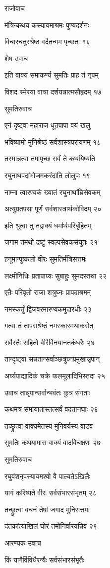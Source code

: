 राजोवाच

मंत्रिन्कथय कस्यायमाश्रमः पुण्यदर्शनः

विचारचतुरश्रेष्ठ वदैतन्मम पृच्छतः १६

शेष उवाच

इति वाक्यं समाकर्ण्य सुमतिः प्राह तं नृपम्

विशद स्मेरया वाचा दर्शयन्नात्मसौहृदम् १७

सुमतिरुवाच

एनं दृष्ट्वा महाराज धूतपापा वयं खलु

भविष्यामो मुनिश्रेष्ठं सर्वशास्त्रपरायणम् १८

तस्मान्नत्वा तमापृच्छ सर्वं ते कथयिष्यति

रघुनाथपदांभोजमकरंदाति लोलुपः १९

नाम्ना त्वारण्यकं ख्यातं रघुनाथांघ्रिसेवकम्

अत्युग्रतपसा पूर्णं सर्वशास्त्रार्थकोविदम् २०

इति श्रुत्वा तु तद्वाक्यं धर्मार्थपरिबृंहितम्

जगाम तमथो द्रष्टुं स्वल्पसेवकसंयुतः २१

हनूमान्पुष्कलो वीरः सुमतिर्मंत्रिसत्तमः

लक्ष्मीनिधिः प्रतापाग्र्यः सुबाहुः सुमदस्तथा २२

एतैः परिवृतो राजा शत्रुघ्नः प्रापदाश्रमम्

नमस्कर्तुं द्विजवरमारण्यकमुदारधीः २३

गत्वा तं तापसश्रेष्ठं नमस्कारमथाकरोत्

सर्वैस्तैः सहितो वीरैर्विनयानतकंधरैः २४

तान्दृष्ट्वा सन्नतान्सर्वाञ्छत्रुघ्नप्रमुखान्नृपान्

अर्घ्यपाद्यादिकं चक्रे फलमूलादिभिस्तदा २५

उवाच तान्नृपान्सर्वान्भवंतः कुत्र संगताः

कथमत्र समायातास्तत्सर्वं वदतानघाः २६

तच्छ्रुत्वा वाक्यमेतस्य मुनिवर्यस्य वाडव

सुमतिः कथयामास वाक्यं वादविचक्षणः २७

सुमतिरुवाच

रघुवंशनृपस्यायमश्वो वै पाल्यतेऽखिलैः

यागं करिष्यते वीरः सर्वसंभारसंभृतम् २८

तच्छ्रुत्वा वचनं तेषां जगाद मुनिसत्तमः

दंतकांत्याखिलं घोरं तमोनिर्वारयन्निव २९

आरण्यक उवाच

किं यागैर्विविधैरन्यैः सर्वसंभारसंभृतैः

